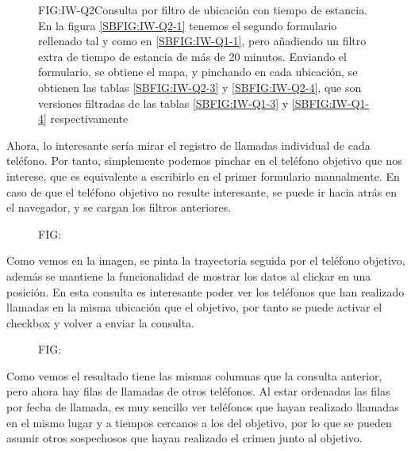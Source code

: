     \begin{figure}[Consulta por filtro de ubicación con tiempo de estancia]{FIG:IW-Q2}{Consulta por filtro de ubicación con tiempo de estancia. En la figura \ref{SBFIG:IW-Q2-1} tenemos el segundo formulario rellenado tal y como en \ref{SBFIG:IW-Q1-1}, pero añadiendo un filtro extra de tiempo de estancia de más de 20 minutos. Enviando el formulario, se obtiene el mapa, y pinchando en cada ubicación, se obtienen las tablas \ref{SBFIG:IW-Q2-3} y \ref{SBFIG:IW-Q2-4}, que son versiones  filtradas de las tablas \ref{SBFIG:IW-Q1-3} y \ref{SBFIG:IW-Q1-4} respectivamente}
       \quad
    \end{figure}
    Ahora, lo interesante sería mirar el registro de llamadas individual de cada teléfono. Por tanto, simplemente podemos pinchar en el teléfono objetivo que nos interese, que es equivalente a escribirlo en el primer formulario manualmente. En caso de que el teléfono objetivo no resulte interesante, se puede ir hacia atrás en el navegador, y se cargan los filtros anteriores.
    \begin{figure}[]{FIG:}{}
      \image{}{}{}
    \end{figure}
    Como vemos en la imagen, se pinta la trayectoria seguida por el teléfono objetivo, además se mantiene la funcionalidad de mostrar los datos al clickar en una posición. 
    En esta consulta es interesante poder ver los teléfonos que han realizado llamadas en la misma ubicación que el objetivo, por tanto se puede activar el checkbox y volver a enviar la consulta. 
    \begin{figure}[]{FIG:}{}
      \image{}{}{}
    \end{figure}
    Como vemos el resultado tiene las mismas columnas que la consulta anterior, pero ahora hay filas de llamadas de otros teléfonos. 
    Al estar ordenadas las filas por fecba de llamada, es muy sencillo ver teléfonos que hayan realizado llamadas en el mismo lugar y a tiempos cercanos a los del objetivo, por lo que se pueden asumir otros sospechosos que hayan realizado el crimen junto al objetivo.